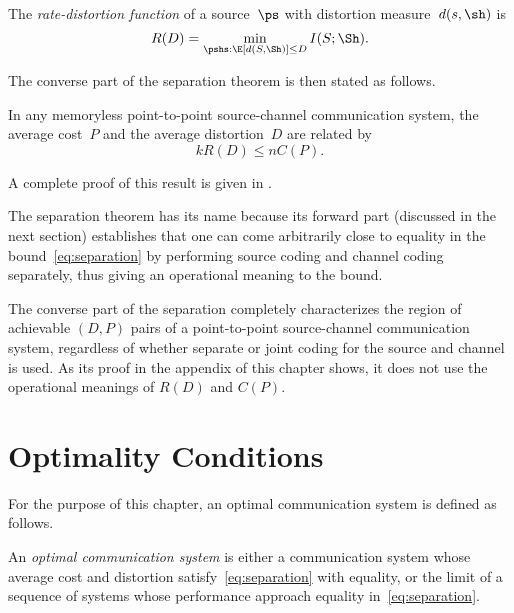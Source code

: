 \begin{definition}
  \label{def:ratedistortion}
  The \emph{rate-distortion function} of a source~$\ps$ with distortion
  measure~$d(s,\sh)$ is 
  \begin{equation*}
    R(D) = \min_{\pshs: \E[d(S,\Sh)] \le D} I(S;\Sh).
  \end{equation*}
\end{definition}

The converse part of the separation theorem is then stated as follows.

\begin{theorem}
  \label{thm:separationconverse}
  In any memoryless point-to-point source-channel communication system, the
  average cost~$P$ and the average distortion~$D$ are related by
  \begin{equation}
    \label{eq:separation}
    kR(D) \le nC(P).
  \end{equation}
\end{theorem}

A complete proof of this result is given in . 

The separation theorem has its name because its forward part (discussed in the
next section) establishes that one can come arbitrarily close to equality in the
bound~\eqref{eq:separation} by performing source coding and channel coding
separately, thus giving an operational meaning to the bound.

The converse part of the separation completely characterizes the region of
achievable $(D,P)$ pairs of a point-to-point source-channel communication
system, regardless of whether separate or joint coding for the source and
channel is used. As its proof in the appendix of this chapter shows, it does not
use the operational meanings of $R(D)$ and $C(P)$.


\section{Optimality Conditions}\label{sec:optimality}

For the purpose of this chapter, an optimal communication system is
defined as follows.

\begin{definition}
  \label{def:optimality}
  An \emph{optimal communication system} is either a communication system whose
  average cost and distortion satisfy~\eqref{eq:separation} with equality, or
  the limit of a sequence of systems whose performance approach equality
  in~\eqref{eq:separation}.
\end{definition}

